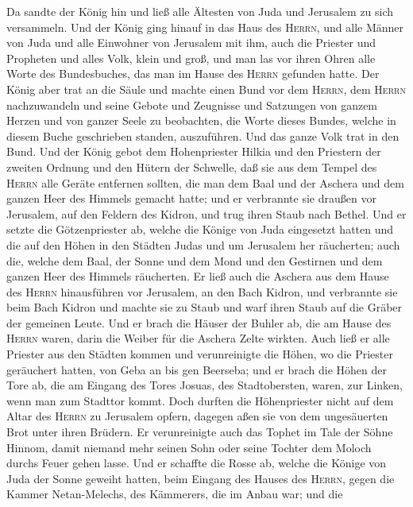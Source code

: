  Da sandte der König hin und ließ alle Ältesten von Juda
und Jerusalem zu sich versammeln.  Und der König ging
hinauf in das Haus des \textsc{Herrn}, und alle Männer von Juda und alle
Einwohner von Jerusalem mit ihm, auch die Priester und Propheten und
alles Volk, klein und groß, und man las vor ihren Ohren alle Worte des
Bundesbuches, das man im Hause des \textsc{Herrn} gefunden hatte.
 Der König aber trat an die Säule und machte einen Bund
vor dem \textsc{Herrn}, dem \textsc{Herrn} nachzuwandeln und seine
Gebote und Zeugnisse und Satzungen von ganzem Herzen und von ganzer
Seele zu beobachten, die Worte dieses Bundes, welche in diesem Buche
geschrieben standen, auszuführen. Und das ganze Volk trat in den Bund.
 Und der König gebot dem Hohenpriester Hilkia und den
Priestern der zweiten Ordnung und den Hütern der Schwelle, daß sie aus
dem Tempel des \textsc{Herrn} alle Geräte entfernen sollten, die man dem
Baal und der Aschera und dem ganzen Heer des Himmels gemacht hatte; und
er verbrannte sie draußen vor Jerusalem, auf den Feldern des Kidron, und
trug ihren Staub nach Bethel.  Und er setzte die
Götzenpriester ab, welche die Könige von Juda eingesetzt hatten und die
auf den Höhen in den Städten Judas und um Jerusalem her räucherten; auch
die, welche dem Baal, der Sonne und dem Mond und den Gestirnen und dem
ganzen Heer des Himmels räucherten.  Er ließ auch die
Aschera aus dem Hause des \textsc{Herrn} hinausführen vor Jerusalem, an
den Bach Kidron, und verbrannte sie beim Bach Kidron und machte sie zu
Staub und warf ihren Staub auf die Gräber der gemeinen Leute.
 Und er brach die Häuser der Buhler ab, die am Hause des
\textsc{Herrn} waren, darin die Weiber für die Aschera Zelte wirkten.
 Auch ließ er alle Priester aus den Städten kommen und
verunreinigte die Höhen, wo die Priester geräuchert hatten, von Geba an
bis gen Beerseba; und er brach die Höhen der Tore ab, die am Eingang des
Tores Josuas, des Stadtobersten, waren, zur Linken, wenn man zum
Stadttor kommt.  Doch durften die Höhenpriester nicht auf
dem Altar des \textsc{Herrn} zu Jerusalem opfern, dagegen aßen sie von
dem ungesäuerten Brot unter ihren Brüdern.  Er
verunreinigte auch das Tophet im Tale der Söhne Hinnom, damit niemand
mehr seinen Sohn oder seine Tochter dem Moloch durchs Feuer gehen lasse.
 Und er schaffte die Rosse ab, welche die Könige von Juda
der Sonne geweiht hatten, beim Eingang des Hauses des \textsc{Herrn},
gegen die Kammer Netan-Melechs, des Kämmerers, die im Anbau war; und die
